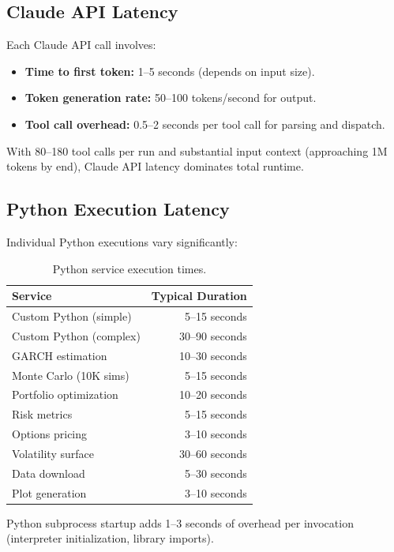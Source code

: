 \subsection{Claude API Latency}

Each Claude API call involves:
\begin{itemize}
  \item \textbf{Time to first token:} 1--5 seconds (depends on input size).
  \item \textbf{Token generation rate:} 50--100 tokens/second for output.
  \item \textbf{Tool call overhead:} 0.5--2 seconds per tool call for parsing and dispatch.
\end{itemize}

With 80--180 tool calls per run and substantial input context (approaching 1M tokens by end), Claude API latency dominates total runtime.

\subsection{Python Execution Latency}

Individual Python executions vary significantly:

\begin{table}[H]
\centering
\caption{Python service execution times.}
\label{tab:python-latency}
\begin{tabular}{lr}
\toprule
\textbf{Service} & \textbf{Typical Duration} \\
\midrule
Custom Python (simple) & 5--15 seconds \\
Custom Python (complex) & 30--90 seconds \\
GARCH estimation & 10--30 seconds \\
Monte Carlo (10K sims) & 5--15 seconds \\
Portfolio optimization & 10--20 seconds \\
Risk metrics & 5--15 seconds \\
Options pricing & 3--10 seconds \\
Volatility surface & 30--60 seconds \\
Data download & 5--30 seconds \\
Plot generation & 3--10 seconds \\
\bottomrule
\end{tabular}
\end{table}

Python subprocess startup adds 1--3 seconds of overhead per invocation (interpreter initialization, library imports).

